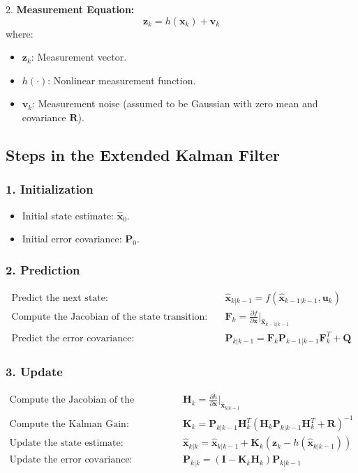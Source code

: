 2. \textbf{Measurement Equation:}
\[
\mathbf{z}_k = h(\mathbf{x}_k) + \mathbf{v}_k
\]
where:
\begin{itemize}
	\item \( \mathbf{z}_k \): Measurement vector.
	\item \( h(\cdot) \): Nonlinear measurement function.
	\item \( \mathbf{v}_k \): Measurement noise (assumed to be Gaussian with zero mean and covariance \( \mathbf{R} \)).
\end{itemize}

\subsection {Steps in the Extended Kalman Filter}

\subsubsection {1. Initialization}
\begin{itemize}
	\item Initial state estimate: \( \hat{\mathbf{x}}_0 \).
	\item Initial error covariance: \( \mathbf{P}_0 \).
\end{itemize}

\subsubsection {2. Prediction}
\begin{align*}
	\text{Predict the next state:} & \quad \hat{\mathbf{x}}_{k|k-1} = f(\hat{\mathbf{x}}_{k-1|k-1}, \mathbf{u}_k) \\
	\text{Compute the Jacobian of the state transition:} & \quad \mathbf{F}_k = \frac{\partial f}{\partial \mathbf{x}} \bigg|_{\hat{\mathbf{x}}_{k-1|k-1}} \\
	\text{Predict the error covariance:} & \quad \mathbf{P}_{k|k-1} = \mathbf{F}_k \mathbf{P}_{k-1|k-1} \mathbf{F}_k^T + \mathbf{Q}
\end{align*}

\subsubsection{3. Update}
\begin{align*}
	\text{Compute the Jacobian of the measurement function:} & \quad \mathbf{H}_k = \frac{\partial h}{\partial \mathbf{x}} \bigg|_{\hat{\mathbf{x}}_{k|k-1}} \\
	\text{Compute the Kalman Gain:} & \quad \mathbf{K}_k = \mathbf{P}_{k|k-1} \mathbf{H}_k^T (\mathbf{H}_k \mathbf{P}_{k|k-1} \mathbf{H}_k^T + \mathbf{R})^{-1} \\
	\text{Update the state estimate:} & \quad \hat{\mathbf{x}}_{k|k} = \hat{\mathbf{x}}_{k|k-1} + \mathbf{K}_k (\mathbf{z}_k - h(\hat{\mathbf{x}}_{k|k-1})) \\
	\text{Update the error covariance:} & \quad \mathbf{P}_{k|k} = (\mathbf{I} - \mathbf{K}_k \mathbf{H}_k) \mathbf{P}_{k|k-1}
\end{align*}

